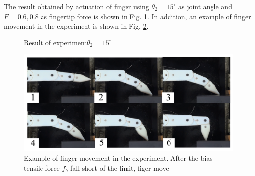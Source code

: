 \documentclass{llncs}
\begin{document}
The result obtained by actuation of finger using $\theta_2=15^{\circ}$ as joint angle 
and $F=0.6,0.8$ as fingertip force 
is shown in Fig. \ref{fig:slack_conclusion}.
In addition, an example of finger movement in the experiment is shown in Fig. \ref{pic:example_slack}.
	\begin{figure}[tb]
	\centering
		\caption{Result of experiment$\theta_2=15^{\circ}$}
		\label{fig:slack_conclusion}
	\end{figure}
	\begin{figure}[tb]
		\centering
		\includegraphics[width=.90\textwidth]{./figure/frame1733r60b180.pdf}
		\caption{Example of finger movement in the experiment. After the bias tensile force $f_b$ fall short of the limit, figer move.}
		\label{pic:example_slack}
	\end{figure}
\end{document}
